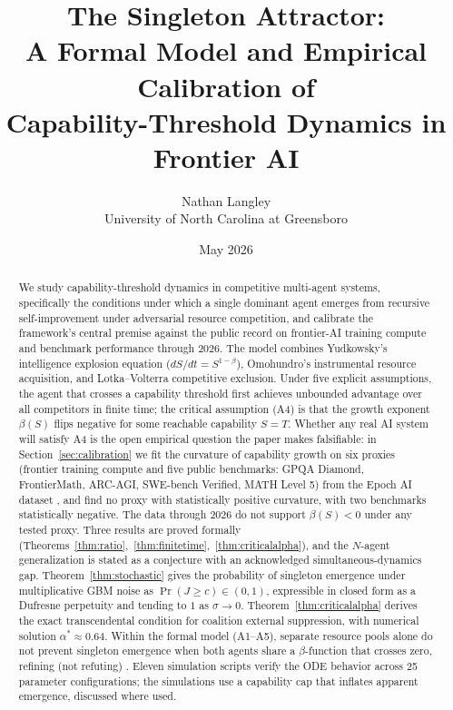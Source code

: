 \documentclass[11pt,letterpaper]{article}
\title{The Singleton Attractor:\\
A Formal Model and Empirical Calibration of\\
Capability-Threshold Dynamics in Frontier AI}
\author{Nathan Langley\\[2pt]
\small University of North Carolina at Greensboro}
\date{May 2026}
\theoremstyle{plain}
\theoremstyle{definition}
\theoremstyle{remark}
\begin{document}
\maketitle

\begin{abstract}
We study capability-threshold dynamics in competitive multi-agent
systems, specifically the conditions under which a single dominant
agent emerges from recursive self-improvement under adversarial resource
competition, and calibrate the framework's central premise against the
public record on frontier-AI training compute and benchmark performance
through $2026$.
The model combines Yudkowsky's intelligence explosion equation
($dS/dt = S^{1-\beta}$), Omohundro's instrumental resource acquisition,
and Lotka--Volterra competitive exclusion.
Under five explicit assumptions, the agent that crosses a capability
threshold first achieves unbounded advantage over all competitors in
finite time; the critical assumption (A4) is that the growth exponent
$\beta(S)$ flips negative for some reachable capability $S = T$.
Whether any real AI system will satisfy A4 is the open empirical question
the paper makes falsifiable: in Section~\ref{sec:calibration} we fit the
curvature of capability growth on six proxies (frontier training compute
and five public benchmarks: GPQA Diamond, FrontierMath, ARC-AGI,
SWE-bench Verified, MATH Level 5) from the Epoch AI dataset
\citep{epoch2024compute}, and find no proxy with statistically positive
curvature, with two benchmarks statistically negative.
The data through $2026$ do not support $\beta(S) < 0$ under any tested
proxy.
Three results are proved formally
(Theorems~\ref{thm:ratio},~\ref{thm:finitetime},~\ref{thm:criticalalpha}),
and the $N$-agent generalization is stated as a conjecture with an
acknowledged simultaneous-dynamics gap.
Theorem~\ref{thm:stochastic} gives the probability of singleton
emergence under multiplicative GBM noise as $\Pr(J \geq c) \in (0,1)$,
expressible in closed form as a Dufresne perpetuity and tending to $1$
as $\sigma \to 0$.
Theorem~\ref{thm:criticalalpha} derives the exact transcendental
condition for coalition external suppression, with numerical solution
$\alpha^* \approx 0.64$.
Within the formal model (A1--A5), separate resource pools alone do not
prevent singleton emergence when both agents share a $\beta$-function that
crosses zero, refining (not refuting) \citet{bostrom2005singleton}.
Eleven simulation scripts verify the ODE behavior across 25 parameter
configurations; the simulations use a capability cap that inflates
apparent emergence, discussed where used.
\end{abstract}
\end{document}
